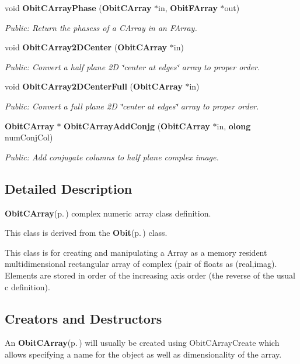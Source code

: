 \begin{CompactItemize}
void {\bf Obit\-CArray\-Phase} ({\bf Obit\-CArray} $\ast$in, {\bf Obit\-FArray} $\ast$out)
\begin{CompactList}\small\item\em Public: Return the phasess of a CArray in an FArray. \item\end{CompactList}\item 
void {\bf Obit\-CArray2DCenter} ({\bf Obit\-CArray} $\ast$in)
\begin{CompactList}\small\item\em Public: Convert a half plane 2D \char`\"{}center at edges\char`\"{} array to proper order. \item\end{CompactList}\item 
void {\bf Obit\-CArray2DCenter\-Full} ({\bf Obit\-CArray} $\ast$in)
\begin{CompactList}\small\item\em Public: Convert a full plane 2D \char`\"{}center at edges\char`\"{} array to proper order. \item\end{CompactList}\item 
{\bf Obit\-CArray} $\ast$ {\bf Obit\-CArray\-Add\-Conjg} ({\bf Obit\-CArray} $\ast$in, {\bf olong} num\-Conj\-Col)
\begin{CompactList}\small\item\em Public: Add conjugate columns to half plane complex image. \item\end{CompactList}\end{CompactItemize}


\subsection{Detailed Description}
{\bf Obit\-CArray}{\rm (p.\,\pageref{structObitCArray})} complex numeric array class definition. 

This class is derived from the {\bf Obit}{\rm (p.\,\pageref{structObit})} class.

This class is for creating and manipulating a Array as a memory resident multidimensional rectangular array of complex (pair of floats as (real,imag). Elements are stored in order of the increasing axis order (the reverse of the usual c definition).\subsection{Creators and Destructors}\label{ObitCArray_8h_ObitCArrayaccess}
An {\bf Obit\-CArray}{\rm (p.\,\pageref{structObitCArray})} will usually be created using Obit\-CArray\-Create which allows specifying a name for the object as well as dimensionality of the array.

